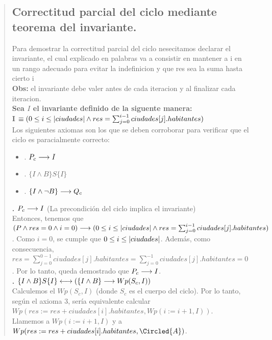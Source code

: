 \documentclass[10pt,a4paper]{article}
\begin{document}
\begin{quote}
 \subsection{Correctitud parcial del ciclo mediante teorema del invariante.}
 Para demostrar la correctitud parcial del ciclo nesecitamos declarar el invariante, el cual explicado en palabras va a consistir en mantener a i en un rango adecuado para evitar la indefinicion y que res sea la suma hasta cierto i \\ [0.2cm]
 \textbf{Obs:} el invariante debe valer antes de cada iteracion y al finalizar cada iteracion.\\ [0.2cm] 
 \textbf{Sea \(I\) el invariante definido de la siguente manera:} \\ [0.1cm]
 \textbf{I} $\equiv(0 \leq i \leq |ciudades| \land res = \sum_{j=0}^{i-1}ciudades[j].habitantes)$ \\ [0.2cm] 
 Los siguientes axiomas son los que se deben corroborar para verificar que el ciclo es paracialmente correcto:
\begin{itemize}
 \item {}. $P_c \longrightarrow I$
 \item {}. $\{I \land B\} S \{I\}$
 \item {}. $\{I \land \neg B\} \longrightarrow Q_c$
 \end{itemize}
 \textbf{. $P_c \longrightarrow I$} (La precondición del ciclo implica el invariante) \\ [0.1cm]
 Entonces, tenemos que $(P \land res = 0 \land i = 0) \longrightarrow (0 \leq i \leq |ciudades| \land res = \sum_{j=0}^{i-1}ciudades[j].habitantes)$. Como $i = 0$, se cumple que $0 \leq i \leq |ciudades|$. Además, como consecuencia, $res = \sum_{j=0}^{0-1}ciudades[j].habitantes = \sum_{j=0}^{-1}ciudades[j].habitantes = 0$. Por lo tanto, queda demostrado que $P_c \longrightarrow I$.\\ [0.2cm] 
 \textbf{. $\{I \land B\} S \{I\} \longleftrightarrow (\{I \land B\} \longrightarrow Wp(S_c, I))$} \\ [0.2cm]
 Calculemos el $Wp(S_c, I)$ (donde $S_c$ es el cuerpo del ciclo). Por lo tanto, según el axioma 3, sería equivalente calcular $Wp(res := res + ciudades[i].habitantes, Wp(i := i + 1, I))$. \\
 
 Llamemos  a $Wp(i := i + 1, I)$ y  a $Wp(res := res + ciudades[i].habitantes, \Circled{A})$. \\ [0.1cm]
 

\end{quote}
\end{document}
